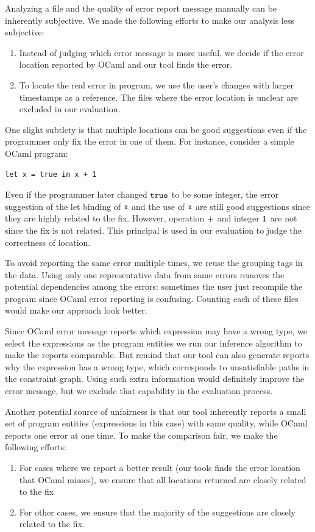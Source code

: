 Analyzing a file and the quality of error report message manually can
be inherently subjective. We made the following efforts to make our
analysis less subjective:
\begin{enumerate}
\item Instead of judging which error message is more useful, we decide
if the error location reported by OCaml and our tool finds the error.

\item To locate the real error in program, we use the user's changes
with larger timestamps as a reference. The files where the error
location is unclear are excluded in our evaluation.
\end{enumerate}

One slight subtlety is that multiple locations can be good suggestions
even if the programmer only fix the error in one of them. For
instance, consider a simple OCaml program:
\begin{lstlisting}
let x = true in x + 1
\end{lstlisting}

Even if the programmer later changed $\mathtt{true}$ to be some integer,
the error suggestion of the let binding of $\mathtt{x}$ and the use of
$\mathtt{x}$ are still good suggestions since they are highly related to
the fix. However, operation $\mathtt{+}$ and integer $\mathtt{1}$ are not
since the fix is not related. This principal is used in our evaluation
to judge the correctness of location.

To avoid reporting the same error multiple times, we reuse the
grouping tags in the data. Using only one representative data from
same errors removes the potential dependencies among the errors:
sometimes the user just recompile the program since OCaml error
reporting is confusing. Counting each of these files would make our
approach look better.

Since OCaml error message reports which expression may have a wrong
type, we select the expressions as the program entities we run our
inference algorithm to make the reports comparable. But remind that
our tool can also generate reports why the expression has a wrong
type, which corresponds to unsatisfiable paths in the constraint
graph. Using such extra information would definitely improve the error
message, but we exclude that capability in the evaluation process.

Another potential source of unfairness is that our tool inherently
reports a small set of program entities (expressions in this case)
with same quality, while OCaml reports one error at one time. To make
the comparison fair, we make the following efforts:
\begin{enumerate}
\item For cases where we report a better result (our tools finds the
error location that OCaml misses), we ensure that all locations
returned are closely related to the fix

\item For other cases, we ensure that the majority of the suggestions
are closely related to the fix. 
\end{enumerate}

